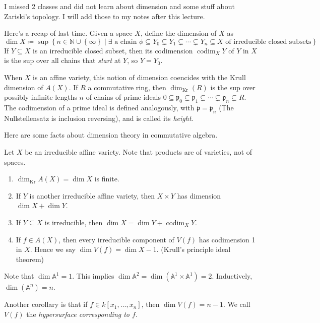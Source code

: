 
I missed 2 classes and did not learn about dimension and some stuff about Zariski's topology. I will add those to my notes after this lecture.

Here's a recap of last time. Given a space $X$, define the dimension of $X$ as
\[
	\dim X \coloneqq \sup \left\{ n\in\mathbb{N} \cup \left\{ \infty  \right\} \mid \exists \text{ a chain } \phi \subseteq Y_0 \subsetneq Y_1 \subsetneq \cdots \subsetneq Y_n \subseteq X \text{ of irreducible closed subsets} \right\} 
.\]
If $Y\subseteq X$ is an irreducible closed subset, then its codimension $\operatorname{codim}_XY$ of $Y$ in $X$ is the sup over all chains that \emph{start} at $Y$, so $Y=Y_0$.

When $X$ is an affine variety, this notion of dimension coencides with the Krull dimension of $A(X)$. If $R$ a commutative ring, then $\dim_{\mathrm{Kr} } (R)$ is the sup over possibly infinite lengths $n$ of chains of prime ideals $0\subseteq \mathfrak{p}_0 \subsetneq \mathfrak{p} _1 \subsetneq \cdots \subsetneq \mathfrak{p} _n \subsetneq R$. The codimension of a prime ideal is defined analogously, with $\mathfrak{p} =\mathfrak{p} _n$ (The Nullstellensatz is inclusion reversing), and is called its \emph{height}.

Here are some facts about dimension theory in commutative algebra.

\begin{theorem}\label{thm:?}
	Let $X$ be an irreducible affine variety. Note that products are of varieties, not of spaces.
	\begin{enumerate}
		\item $\dim_{\mathrm{Kr}}A(X) = \dim X$ is finite.
		\item If $Y$ is another irreducible affine variety, then $X\times Y$ has dimension $\dim X +\dim Y$.
		\item If $Y \subseteq X$ is irreducible, then $\dim X = \dim Y + \operatorname{codim} _XY$.
		\item If $f\in A(X)$, then every irreducible component of $V(f)$ has codimension 1 in $X$. Hence we say $\dim V(f) = \dim X - 1$. (Krull's principle ideal theorem)
	\end{enumerate}
\end{theorem}
Note that $\dim \mathbb{A} ^1=1$. This implies $\dim \mathbb{A} ^2 = \dim (\mathbb{A} ^1\times \mathbb{A} ^1)=2$. Inductively, $\dim (\mathbb{A} ^n)=n$.

Another corollary is that if $f\in k[x_1, \ldots , x_n]$, then $\dim V(f) = n-1$. We call $V(f)$ the \emph{hypersurface corresponding to $f$}.


